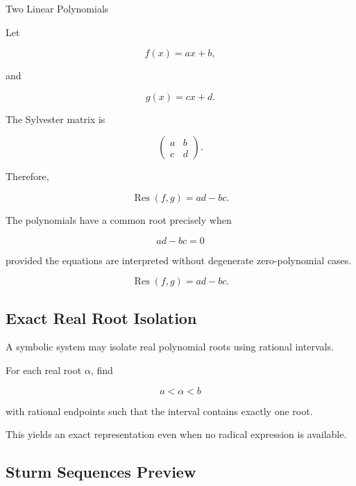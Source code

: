 \begin{workedexamplebox}{Two Linear Polynomials}

Let

\[
f(x)=ax+b,
\]

and

\[
g(x)=cx+d.
\]

The Sylvester matrix is

\[
\begin{pmatrix}
a&b\\
c&d
\end{pmatrix}.
\]

Therefore,

\[
\operatorname{Res}(f,g)
=
ad-bc.
\]

The polynomials have a common root precisely when

\[
ad-bc=0
\]

provided the equations are interpreted without degenerate zero-polynomial
cases.

\begin{answerbox}
\[
\boxed{
\operatorname{Res}(f,g)
=
ad-bc.
}
\]
\end{answerbox}

\end{workedexamplebox}

\subsection{Exact Real Root Isolation}
\label{subsec:exact-real-root-isolation}

A symbolic system may isolate real polynomial roots using rational
intervals.

For each real root \(\alpha\), find

\[
\boxed{
a<\alpha<b
}
\]

with rational endpoints such that the interval contains exactly one root.

This yields an exact representation even when no radical expression is
available.

\subsection{Sturm Sequences Preview}
\label{subsec:sturm-sequences-preview}

